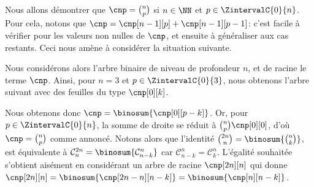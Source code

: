 Nous allons démontrer que $\cnp = \binom{n}{p}$ si $n \in \NN$ et $p \in \ZintervalC{0}{n}$.
%
Pour cela, notons que $\cnp = \cnp[n-1][p] + \cnp[n-1][p-1]$:
c'est facile à vérifier pour les valeurs non nulles de $\cnp$, et ensuite à généraliser aux cas restants.
Ceci nous amène à considérer la situation suivante.

\explaintree{\cnp}{\cnp[n-1][p-1]}{\cnp[n-1][p]}%
            {\factobinomintertree}{}

Nous considérons alors l'arbre binaire de niveau de profondeur $n$, et de racine le terme $\cnp$.
Ainsi, pour $n=3$ et $p \in \ZintervalC{0}{3}$,
nous obtenons l'arbre suivant avec des feuilles du type $\cnp[0][k]$.


Nous obtenons donc
$\cnp = \binosum{\cnp[0][p-k]}$.
Or, pour $p \in \ZintervalC{0}{n}$, la somme de droite se réduit à $\binom{n}{p} \cnp[0][0]$, d'où $\cnp = \binom{n}{p}$ comme annoncé.
%
Notons alors que l'identité
$\binom{2n}{n} = \binosum{\binom{n}{k}}$,
est équivalente à
$\mathcal{C}^{2n}_n = \binosum{\mathcal{C}^n_{n-k}}$ car $\mathcal{C}^n_{n-k} = \mathcal{C}^n_k$.
%
L'égalité souhaitée s'obtient aisément en considérant un arbre de racine $\cnp[2n][n]$ qui donne
$\cnp[2n][n] = \binosum{\cnp[2n - n][n-k]} = \binosum{\cnp[n][n-k]}$.